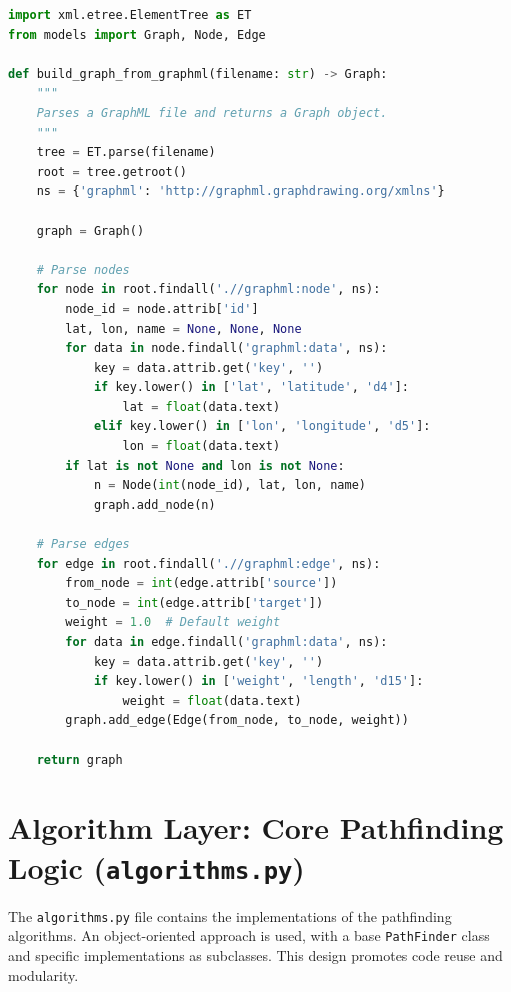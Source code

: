 \documentclass[12pt, a4paper]{report}
\begin{document}
\begin{lstlisting}[language=Python, caption={Code Snippet: `build\_graph.py'}, label={lst:build_graph}]
import xml.etree.ElementTree as ET
from models import Graph, Node, Edge

def build_graph_from_graphml(filename: str) -> Graph:
    """
    Parses a GraphML file and returns a Graph object.
    """
    tree = ET.parse(filename)
    root = tree.getroot()
    ns = {'graphml': 'http://graphml.graphdrawing.org/xmlns'}

    graph = Graph()

    # Parse nodes
    for node in root.findall('.//graphml:node', ns):
        node_id = node.attrib['id']
        lat, lon, name = None, None, None
        for data in node.findall('graphml:data', ns):
            key = data.attrib.get('key', '')
            if key.lower() in ['lat', 'latitude', 'd4']:
                lat = float(data.text)
            elif key.lower() in ['lon', 'longitude', 'd5']:
                lon = float(data.text)
        if lat is not None and lon is not None:
            n = Node(int(node_id), lat, lon, name)
            graph.add_node(n)

    # Parse edges
    for edge in root.findall('.//graphml:edge', ns):
        from_node = int(edge.attrib['source'])
        to_node = int(edge.attrib['target'])
        weight = 1.0  # Default weight
        for data in edge.findall('graphml:data', ns):
            key = data.attrib.get('key', '')
            if key.lower() in ['weight', 'length', 'd15']:
                weight = float(data.text)
        graph.add_edge(Edge(from_node, to_node, weight))
        
    return graph
\end{lstlisting}

\section{Algorithm Layer: Core Pathfinding Logic (\texttt{algorithms.py})}

The \texttt{algorithms.py} file contains the implementations of the pathfinding algorithms. An object-oriented approach is used, with a base \texttt{PathFinder} class and specific implementations as subclasses. This design promotes code reuse and modularity.
\end{document}
